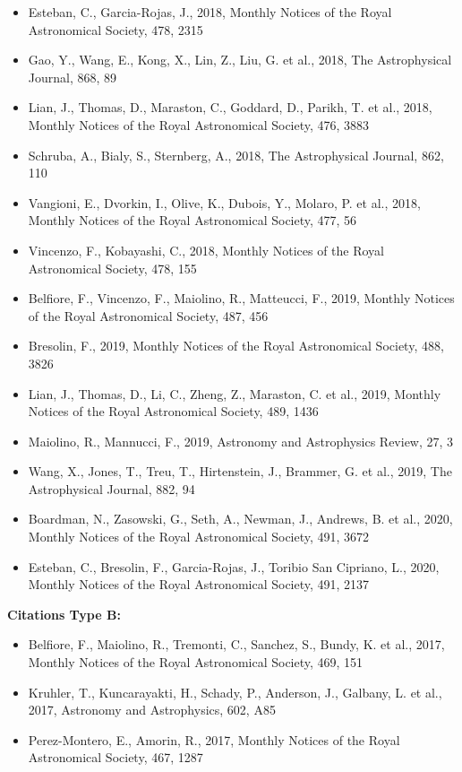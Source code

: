 \documentclass{letter}
\begin{document}
\begin{enumerate}
\begin{itemize}
\item Esteban, C., Garcia-Rojas, J., 2018, Monthly Notices of the Royal Astronomical Society, 478, 2315
\item Gao, Y., Wang, E., Kong, X., Lin, Z., Liu, G. et al., 2018, The Astrophysical Journal, 868, 89
\item Lian, J., Thomas, D., Maraston, C., Goddard, D., Parikh, T. et al., 2018, Monthly Notices of the Royal Astronomical Society, 476, 3883
\item Schruba, A., Bialy, S., Sternberg, A., 2018, The Astrophysical Journal, 862, 110
\item Vangioni, E., Dvorkin, I., Olive, K., Dubois, Y., Molaro, P. et al., 2018, Monthly Notices of the Royal Astronomical Society, 477, 56
\item Vincenzo, F., Kobayashi, C., 2018, Monthly Notices of the Royal Astronomical Society, 478, 155
\item Belfiore, F., Vincenzo, F., Maiolino, R., Matteucci, F., 2019, Monthly Notices of the Royal Astronomical Society, 487, 456
\item Bresolin, F., 2019, Monthly Notices of the Royal Astronomical Society, 488, 3826
\item Lian, J., Thomas, D., Li, C., Zheng, Z., Maraston, C. et al., 2019, Monthly Notices of the Royal Astronomical Society, 489, 1436
\item Maiolino, R., Mannucci, F., 2019, Astronomy and Astrophysics Review, 27, 3
\item Wang, X., Jones, T., Treu, T., Hirtenstein, J., Brammer, G. et al., 2019, The Astrophysical Journal, 882, 94
\item Boardman, N., Zasowski, G., Seth, A., Newman, J., Andrews, B. et al., 2020, Monthly Notices of the Royal Astronomical Society, 491, 3672
\item Esteban, C., Bresolin, F., Garcia-Rojas, J., Toribio San Cipriano, L., 2020, Monthly Notices of the Royal Astronomical Society, 491, 2137
\end{itemize}
{\bf Citations Type B:}
\begin{itemize}
\item Belfiore, F., Maiolino, R., Tremonti, C., Sanchez, S., Bundy, K. et al., 2017, Monthly Notices of the Royal Astronomical Society, 469, 151
\item Kruhler, T., Kuncarayakti, H., Schady, P., Anderson, J., Galbany, L. et al., 2017, Astronomy and Astrophysics, 602, A85
\item Perez-Montero, E., Amorin, R., 2017, Monthly Notices of the Royal Astronomical Society, 467, 1287

\end{itemize}
\end{enumerate}
\end{document}

